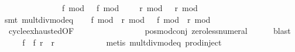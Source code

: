 \begin{isabellebody}
\ \ \ \ \ \ \ \ \ \ \ \ \ \ \ {\isachardoublequoteopen}{\isasymbar}f{}\ mod\ {}\ {\isacharminus}\ f{}\ mod\ {}{\isasymbar}\ {\isasymnoteq}\ {}\ {\isasymor}\ {\isasymbar}r{}\ mod\ {}\ {\isacharminus}\ r{}\ mod\ {}{\isasymbar}\ {\isasymnoteq}\ {}{\isachardoublequoteclose}\isanewline
\ \ \ \ \isamarkupfalse%
\ {\isacharasterisk}{\isacharasterisk}{\isacharparenleft}{}{\isacharminus}{}{\isacharparenright}\isanewline
\ \ \ \ \isamarkupfalse%
\ {\isacharparenleft}smt\ mult{\isacharunderscore}div{\isacharunderscore}mod{\isacharunderscore}eq{\isacharparenright}{\isacharplus}\isanewline
\isanewline
\ \ \isamarkupfalse%
\ {\isachardoublequoteopen}{\isacharparenleft}f{}\ mod\ {}{\isacharcomma}\ r{}\ mod\ {}{\isacharparenright}\ {\isacharequal}\ {\isacharparenleft}f{}\ mod\ {}{\isacharcomma}\ r{}\ mod\ {}{\isacharparenright}{\isachardoublequoteclose}\isanewline
\ \ \ \ \isamarkupfalse%
\ {\isacharasterisk}{\isacharasterisk}{\isacharparenleft}{}{\isacharparenright}\ cycle{}{\isacharunderscore}exhausted{\isacharbrackleft}OF\ {\isacharunderscore}\ {\isacharunderscore}\ {\isacharunderscore}\ {\isacharunderscore}\ {\isacharunderscore}\ {\isacharunderscore}\ {\isacharunderscore}\ {\isacharunderscore}\ {\isacharunderscore}\ {}\ {}{\isacharbrackright}\isanewline
\ \ \ \ \isamarkupfalse%
\ pos{\isacharunderscore}mod{\isacharunderscore}conj\ zero{\isacharunderscore}less{\isacharunderscore}numeral\isanewline
\ \ \ \ \isamarkupfalse%
\ blast\isanewline
\isanewline
\ \ \isamarkupfalse%
\ \isamarkupfalse%
\ {\isachardoublequoteopen}f{}\ {\isacharequal}\ f{}{\isachardoublequoteclose}\ {\isachardoublequoteopen}r{}\ {\isacharequal}\ r{}{\isachardoublequoteclose}\isanewline
\ \ \ \ \isamarkupfalse%
\ {\isacharasterisk}{\isacharasterisk}{\isacharparenleft}{}{\isacharminus}{}{\isacharparenright}\isanewline
\ \ \ \ \isamarkupfalse%
\ {\isacharparenleft}metis\ mult{\isacharunderscore}div{\isacharunderscore}mod{\isacharunderscore}eq\ prod{\isachardot}inject{\isacharparenright}{\isacharplus}\isanewline
\isanewline
\ \ \isamarkupfalse%
\ \isamarkupfalse%

\end{isabellebody}
